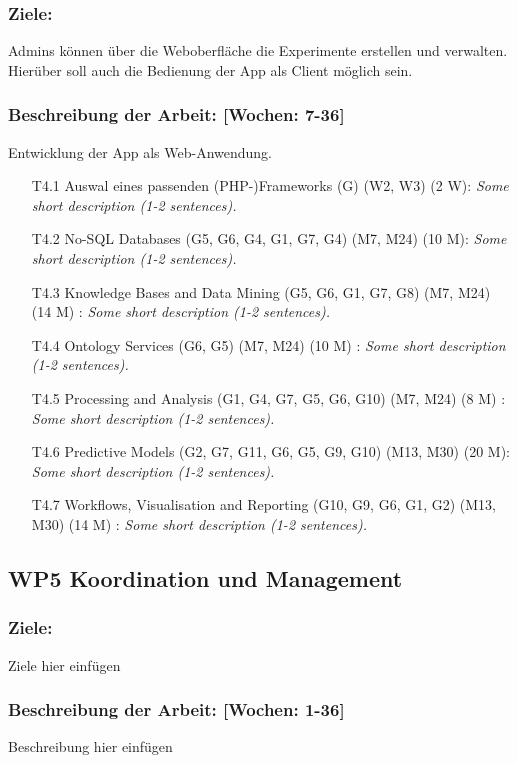 \documentclass{report}
\begin{document}
\subsubsection{Ziele:} Admins können über die Weboberfläche die Experimente erstellen und verwalten. Hierüber soll auch die Bedienung der App als Client möglich sein.
\subsubsection{Beschreibung der Arbeit: [Wochen: 7-36]} Entwicklung der App als Web-Anwendung.

\begin{enumerate}
\item [T4.1] Auswal eines passenden (PHP-)Frameworks (G) (W2, W3) (2 W): \emph{ Some short description (1-2 sentences).}
\item [T4.2] No-SQL Databases (G5, G6, G4, G1, G7, G4) (M7, M24) (10 M): \emph{ Some short description (1-2 sentences).}
\item [T4.3] Knowledge Bases and Data Mining (G5, G6, G1, G7, G8) (M7, M24) (14 M) : \emph{ Some short description (1-2 sentences).}
\item [T4.4] Ontology Services (G6, G5) (M7, M24) (10 M) : \emph{ Some short description (1-2 sentences).}
\item [T4.5] Processing and Analysis (G1, G4, G7, G5, G6, G10) (M7, M24) (8 M) : \emph{ Some short description (1-2 sentences).}
\item [T4.6] Predictive Models (G2, G7, G11, G6, G5, G9, G10) (M13, M30) (20 M): \emph{ Some short description (1-2 sentences).}
\item [T4.7] Workflows, Visualisation and Reporting (G10, G9, G6, G1, G2) (M13, M30) (14 M) : \emph{ Some short description (1-2 sentences).}
\end{enumerate}

\subsection*{WP5 Koordination und Management}

\subsubsection{Ziele:} Ziele hier einfügen
\subsubsection{Beschreibung der Arbeit: [Wochen: 1-36]} Beschreibung hier einfügen
\end{document}
